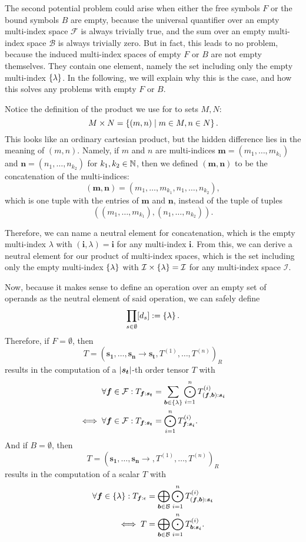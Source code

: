 The second potential problem could arise when either the free symbols $F$ or the bound symbols $B$ are empty,
because the universal quantifier over an empty multi-index space $\mathcal{F}$ is always trivially true, and the sum over an empty multi-index space $\mathcal{B}$ is always trivially zero.
But in fact, this leads to no problem, because the induced multi-index spaces of empty $F$ or $B$ are not empty themselves.
They contain one element, namely the set including only the empty multi-index $\lbrace \lambda \rbrace$.
In the following, we will explain why this is the case, and how this solves any problems with empty $F$ or $B$.

Notice the definition of the product we use for to sets $M, N$:
$$M \times N = \left\lbrace (m, n) \mid m \in M, n \in N \right\rbrace.$$
This looks like an ordinary cartesian product, but the hidden difference lies in the meaning of $(m,n)$.
Namely, if $m$ and $n$ are multi-indices $\bm{m} = (m_1, \dots, m_{k_1})$ and $\bm{n} = (n_1, \dots, n_{k_2})$ for $k_1, k_2 \in \mathbb{N}$, then we defined $(\bm{m}, \bm{n})$ to be the concatenation of the multi-indices:
$$(\bm{m}, \bm{n}) = (m_1, \dots, m_{k_1}, n_1, \dots, n_{k_2}),$$
which is one tuple with the entries of $\bm{m}$ and $\bm{n}$, instead of the tuple of tuples
$$((m_1, \dots, m_{k_1}), (n_1, \dots, n_{k_2})).$$

Therefore, we can name a neutral element for concatenation, which is the empty multi-index $\lambda$ with $(\bm{i}, \lambda) = \bm{i}$ for any multi-index $\bm{i}$.
From this, we can derive a neutral element for our product of multi-index spaces, which is the set including only the empty multi-index $\lbrace \lambda \rbrace$ with $\mathcal{I} \times \lbrace \lambda \rbrace = \mathcal{I}$ for any multi-index space $\mathcal{I}$.

Now, because it makes sense to define an operation over an empty set of operands as the neutral element of said operation, we can safely define
$$\prod\limits_{s \in \emptyset} [d_s] := \left\lbrace \lambda \right\rbrace.$$
Therefore, if $F = \emptyset$, then
$$T = (\bm{s_1},\dots,\bm{s_n} \rightarrow \bm{s_t}, T^{(1)},\dots,T^{(n)})_R$$
results in the computation of a $\left\lvert \bm{s_t} \right\rvert$-th order tensor $T$ with
\begin{align*}
    \forall \bm{f} \in \mathcal{F}: T_{\bm{f}: \bm{s_t}}      & = \sum\limits_{\bm{b} \in \lbrace \lambda \rbrace} \bigodot\limits_{i = 1}^{n} T^{(i)}_{(\bm{f},\bm{b}):\bm{s_i}} \\
    \iff \forall \bm{f} \in \mathcal{F}: T_{\bm{f}: \bm{s_t}} & = \bigodot\limits_{i = 1}^{n} T^{(i)}_{\bm{f}:\bm{s_i}}.
\end{align*}
And if $B = \emptyset$, then
$$T = (\bm{s_1},\dots,\bm{s_n} \rightarrow , T^{(1)},\dots,T^{(n)})_R$$
results in the computation of a scalar $T$ with
\begin{align*}
    \forall \bm{f} \in \lbrace \lambda \rbrace: T_{\bm{f}: \epsilon} & = \bigoplus\limits_{\bm{b} \in \mathcal{B}} \bigodot\limits_{i = 1}^{n} T^{(i)}_{(\bm{f},\bm{b}):\bm{s_i}} \\
    \iff T                                                      & = \bigoplus\limits_{\bm{b} \in \mathcal{B}} \bigodot\limits_{i = 1}^{n} T^{(i)}_{\bm{b}:\bm{s_i}}.
\end{align*}

